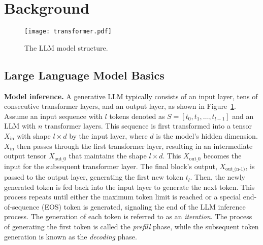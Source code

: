 \section{Background}
\label{background}

\begin{figure}
	\centering
	\texttt{[image: transformer.pdf]}
	\vspace{-0.05in}
	\caption{The LLM model structure.}
	\label{fig:llm}
	\vspace{-0.1in}
\end{figure}

\subsection{Large Language Model Basics}
\label{sec:llm-basic}

\noindent \textbf{Model inference.}
A generative LLM typically consists of an input layer, tens of consecutive transformer layers, and an output layer, as shown in Figure~\ref{fig:llm}. Assume an input sequence with \( l \) tokens denoted as \( S = [t_0, t_1, \dots, t_{l-1}] \) and an LLM with \( n \) transformer layers. This sequence is first transformed into a tensor \( X_{\text{in}} \) with shape \( l \times d \) by the input layer, where \( d \) is the model’s hidden dimension. \( X_{\text{in}} \) then passes through the first transformer layer, resulting in an intermediate output tensor \( X_{\text{out\_0}} \) that maintains the shape \( l \times d \). This \( X_{\text{out\_0}} \) becomes the input for the subsequent transformer layer. The final block's output, \( X_{\text{out\_(n-1)}} \), is passed to the output layer, generating the first new token \( t_l \). 
Then, the newly generated token is fed back into the input layer to generate the next token. This process repeats until either the maximum token limit is reached or a special end-of-sequence (EOS) token is generated, signaling the end of the LLM inference process. The generation of each token is referred to as an \textit{iteration}. The process of generating the first token is called the \textit{prefill} phase, while the subsequent token generation is known as the \textit{decoding} phase.



